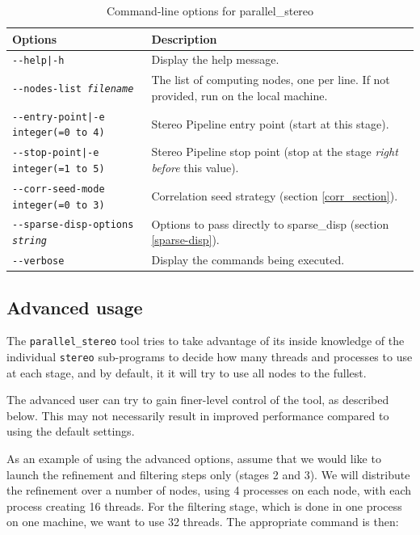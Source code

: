 \begin{longtable}{|l|p{7.5cm}|}
\caption{Command-line options for parallel\_stereo}
\label{tbl:parallelstereo}
\endfirsthead
\endhead
\endfoot
\endlastfoot
\hline
Options & Description \\ \hline \hline
\texttt{-\/-help|-h} & Display the help message.\\ \hline
\texttt{-\/-nodes-list \textit{filename} } & The list of computing nodes,
one per line. If not provided, run on the local machine. \\ \hline
\texttt{-\/-entry-point|-e integer(=0 to 4)} & Stereo Pipeline entry
point (start at this stage). \\ \hline
\texttt{-\/-stop-point|-e integer(=1 to 5)} & Stereo Pipeline stop point
(stop at the stage {\it right before} this value). \\ \hline
\texttt{-\/-corr-seed-mode integer(=0 to 3)} & Correlation seed strategy
(section \ref{corr_section}). \\ \hline
\texttt{-\/-sparse-disp-options \textit{string} } & Options to pass directly
to sparse\_disp (section \ref{sparse-disp}). \\ \hline
\texttt{-\/-verbose } & Display the commands being executed. \\ \hline
\end{longtable}

\subsection{Advanced usage}

The \texttt{parallel\_stereo} tool tries to take advantage of its inside
knowledge of the individual \texttt{stereo} sub-programs to decide
how many threads and processes to use at each stage, and by default, it
it will try to use all nodes to the fullest.

The advanced user can try to gain finer-level control of the tool, as
described below. This may not necessarily result in improved performance
compared to using the default settings.

As an example of using the advanced options, assume that we would like
to launch the refinement and filtering steps only (stages 2 and 3). We
will distribute the refinement over a number of nodes, using 4 processes
on each node, with each process creating 16 threads. For the filtering
stage, which is done in one process on one machine, we want to use 32
threads. The appropriate command is then:


